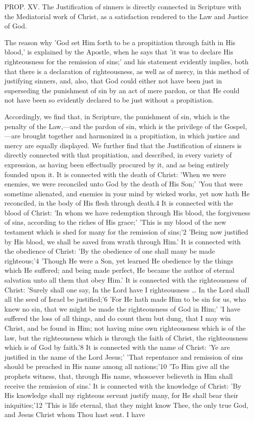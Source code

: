 \documentclass[
]{book}
\begin{document}
PROP. XV. The Justification of sinners is directly connected in Scripture with the Mediatorial work of Christ, as a satisfaction rendered to the Law and Justice of God.

The reason why 'God set Him forth to be a propitiation through faith in His blood,' is explained by the Apostle, when he says that 'it was to declare His righteousness for the remission of sins;' and his statement evidently implies, both that there is a declaration of righteousness, as well as of mercy, in this method of justifying sinners, and, also, that God could either not have been just in superseding the punishment of sin by an act of mere pardon, or that He could not have been so evidently declared to be just without a propitiation.

Accordingly, we find that, in Scripture, the punishment of sin, which is the penalty of the Law,---and the pardon of sin, which is the privilege of the Gospel,---are brought together and harmonized in a propitiation, in which justice and mercy are equally displayed. We further find that the Justification of sinners is directly connected with that propitiation, and described, in every variety of expression, as having been effectually procured by it, and as being entirely founded upon it. It is connected with the death of Christ: 'When we were enemies, we were reconciled unto God by the death of His Son;' 'You that were sometime alienated, and enemies in your mind by wicked works, yet now hath He reconciled, in the body of His flesh through death.4 It is connected with the blood of Christ: 'In whom we have redemption through His blood, the forgiveness of sins, according to the riches of His grace;' 'This is my blood of the new testament which is shed for many for the remission of sins;'2 'Being now justified by His blood, we shall be saved from wrath through Him.' It is connected with the obedience of Christ: 'By the obedience of one shall many be made righteous;'4 'Though He were a Son, yet learned He obedience by the things which He suffered; and being made perfect, He became the author of eternal salvation unto all them that obey Him.' It is connected with the righteousness of Christ: 'Surely shall one say, In the Lord have I righteousness \ldots{} In the Lord shall all the seed of Israel be justified;'6 'For He hath made Him to be sin for us, who knew no sin, that we might be made the righteousness of God in Him;' 'I have suffered the loss of all things, and do count them but dung, that I may win Christ, and be found in Him; not having mine own righteousness which is of the law, but the righteousness which is through the faith of Christ, the righteousness which is of God by faith.'8 It is connected with the name of Christ: 'Ye are justified in the name of the Lord Jesus;' 'That repentance and remission of sins should be preached in His name among all nations;'10 'To Him give all the prophets witness, that, through His name, whosoever believeth in Him shall receive the remission of sins.' It is connected with the knowledge of Christ: 'By His knowledge shall my righteous servant justify many, for He shall bear their iniquities;'12 'This is life eternal, that they might know Thee, the only true God, and Jesus Christ whom Thou hast sent. I have 
\end{document}
